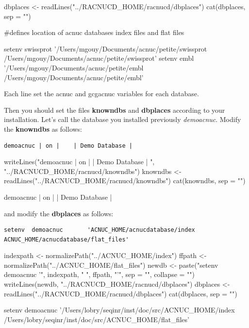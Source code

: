 \documentclass{article}
\begin{document}
\begin{Schunk}
\begin{Sinput}
 dbplaces <- readLines("../RACNUCD_HOME/racnucd/dbplaces")
 cat(dbplaces, sep = "\n")
\end{Sinput}
\begin{Soutput}
#defines location of acnuc databases index files and flat files

setenv 	swissprot 	'/Users/mgouy/Documents/acnuc/petite/swissprot /Users/mgouy/Documents/acnuc/petite/swissprot'
setenv 	embl 	'/Users/mgouy/Documents/acnuc/petite/embl /Users/mgouy/Documents/acnuc/petite/embl'
\end{Soutput}
\end{Schunk}

Each line set the acnuc and gcgacnuc variables for each   database.

Then you should set the files \textbf{knowndbs} and \textbf{dbplaces} according to your installation.
Let's call the database you installed previously \textit{demoacnuc}.
Modify  the \textbf{knowndbs} as follows:
\begin{verbatim}
demoacnuc | on |    | Demo Database | 
\end{verbatim}

\begin{Schunk}
\begin{Sinput}
 writeLines("demoacnuc | on |    | Demo Database | ", "../RACNUCD_HOME/racnucd/knowndbs")
 knowndbs <- readLines("../RACNUCD_HOME/racnucd/knowndbs")
 cat(knowndbs, sep = "\n")
\end{Sinput}
\begin{Soutput}
demoacnuc | on |    | Demo Database | 
\end{Soutput}
\end{Schunk}

and modify  the \textbf{dbplaces} as follows:

\begin{verbatim}
setenv  demoacnuc       'ACNUC_HOME/acnucdatabase/index ACNUC_HOME/acnucdatabase/flat_files'
\end{verbatim}

\begin{Schunk}
\begin{Sinput}
 indexpath <- normalizePath("../ACNUC_HOME/index")
 ffpath <- normalizePath("../ACNUC_HOME/flat_files")
 newdb <- paste("setenv demoacnuc '", indexpath, " ", ffpath, 
     "'", sep = "", collapse = "")
 writeLines(newdb, "../RACNUCD_HOME/racnucd/dbplaces")
 dbplaces <- readLines("../RACNUCD_HOME/racnucd/dbplaces")
 cat(dbplaces, sep = "\n")
\end{Sinput}
\begin{Soutput}
setenv demoacnuc '/Users/lobry/seqinr/inst/doc/src/ACNUC_HOME/index /Users/lobry/seqinr/inst/doc/src/ACNUC_HOME/flat_files'
\end{Soutput}
\end{Schunk}
\end{document}
